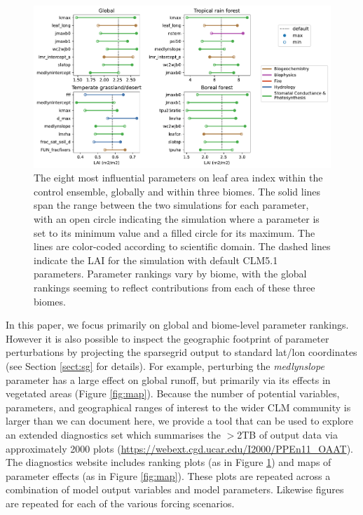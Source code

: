 \documentclass[draft]{agujournal2019}
\begin{document}
\begin{figure}[h]
\centering
\includegraphics[width=\textwidth]{../figs/lai_biome.pdf}
\caption{The eight most influential parameters on leaf area index within the control ensemble, globally and within three biomes. The solid lines span the range between the two simulations for each parameter, with an open circle indicating the simulation where a parameter is set to its minimum value and a filled circle for its maximum. The lines are color-coded according to scientific domain. The dashed lines indicate the LAI for the simulation with default CLM5.1 parameters. Parameter rankings vary by biome, with the global rankings seeming to reflect contributions from each of these three biomes.}
\label{fig:lai}
\end{figure}

In this paper, we focus primarily on global and biome-level parameter rankings. However it is also possible to inspect the geographic footprint of parameter perturbations by projecting the sparsegrid output to standard lat/lon coordinates (see Section \ref{sect:sg} for details). For example, perturbing the \textit{medlynslope} parameter has a large effect on global runoff, but primarily via its effects in vegetated areas (Figure \ref{fig:map}). 
Because the number of potential variables, parameters, and geographical ranges of interest to the wider CLM community is larger than we can document here,  we provide a tool that can be used to explore an extended diagnostics set which summarises the $>$2TB of output data via approximately 2000 plots (\url{https://webext.cgd.ucar.edu/I2000/PPEn11_OAAT}). The diagnostics website includes ranking plots (as in Figure \ref{fig:lai}) and maps of parameter effects (as in Figure \ref{fig:map}). These plots are repeated across a combination of model output variables and model parameters. Likewise figures are repeated for each of the various forcing scenarios. 
\end{document}
